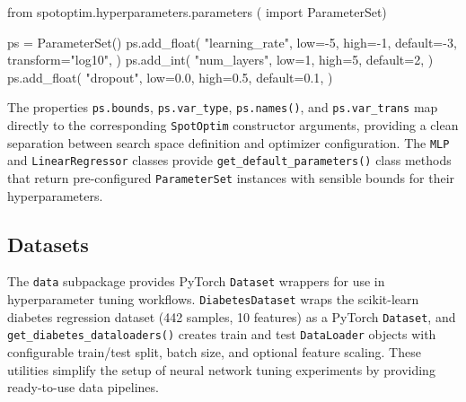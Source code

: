 \documentclass[
  twocolumn]{article}
\newenvironment{Shaded}{\begin{snugshade}}{\end{snugshade}}
\newcommand{\DecValTok}[1]{\textcolor[rgb]{0.68,0.00,0.00}{#1}}
\newcommand{\FloatTok}[1]{\textcolor[rgb]{0.68,0.00,0.00}{#1}}
\newcommand{\ImportTok}[1]{\textcolor[rgb]{0.00,0.46,0.62}{#1}}
\newcommand{\NormalTok}[1]{\textcolor[rgb]{0.00,0.23,0.31}{#1}}
\newcommand{\OperatorTok}[1]{\textcolor[rgb]{0.37,0.37,0.37}{#1}}
\newcommand{\StringTok}[1]{\textcolor[rgb]{0.13,0.47,0.30}{#1}}
\begin{document}
\begin{Shaded}
\begin{Highlighting}[]
\ImportTok{from}\NormalTok{ spotoptim.hyperparameters.parameters (}
    \ImportTok{import}\NormalTok{ ParameterSet)}

\NormalTok{ps }\OperatorTok{=}\NormalTok{ ParameterSet()}
\NormalTok{ps.add\_float(}
    \StringTok{"learning\_rate"}\NormalTok{,}
\NormalTok{    low}\OperatorTok{={-}}\DecValTok{5}\NormalTok{, high}\OperatorTok{={-}}\DecValTok{1}\NormalTok{, default}\OperatorTok{={-}}\DecValTok{3}\NormalTok{,}
\NormalTok{    transform}\OperatorTok{=}\StringTok{"log10"}\NormalTok{,}
\NormalTok{)}
\NormalTok{ps.add\_int(}
    \StringTok{"num\_layers"}\NormalTok{,}
\NormalTok{    low}\OperatorTok{=}\DecValTok{1}\NormalTok{, high}\OperatorTok{=}\DecValTok{5}\NormalTok{, default}\OperatorTok{=}\DecValTok{2}\NormalTok{,}
\NormalTok{)}
\NormalTok{ps.add\_float(}
    \StringTok{"dropout"}\NormalTok{,}
\NormalTok{    low}\OperatorTok{=}\FloatTok{0.0}\NormalTok{, high}\OperatorTok{=}\FloatTok{0.5}\NormalTok{, default}\OperatorTok{=}\FloatTok{0.1}\NormalTok{,}
\NormalTok{)}
\end{Highlighting}
\end{Shaded}

The properties \texttt{ps.bounds}, \texttt{ps.var\_type},
\texttt{ps.names()}, and \texttt{ps.var\_trans} map directly to the
corresponding \texttt{SpotOptim} constructor arguments, providing a
clean separation between search space definition and optimizer
configuration. The \texttt{MLP} and \texttt{LinearRegressor} classes
provide \texttt{get\_default\_parameters()} class methods that return
pre-configured \texttt{ParameterSet} instances with sensible bounds for
their hyperparameters.

\subsection{Datasets}\label{sec-data}

The \texttt{data} subpackage provides PyTorch \texttt{Dataset} wrappers
for use in hyperparameter tuning workflows. \texttt{DiabetesDataset}
wraps the scikit-learn diabetes regression dataset (442 samples, 10
features) as a PyTorch \texttt{Dataset}, and
\texttt{get\_diabetes\_dataloaders()} creates train and test
\texttt{DataLoader} objects with configurable train/test split, batch
size, and optional feature scaling. These utilities simplify the setup
of neural network tuning experiments by providing ready-to-use data
pipelines.
\end{document}

